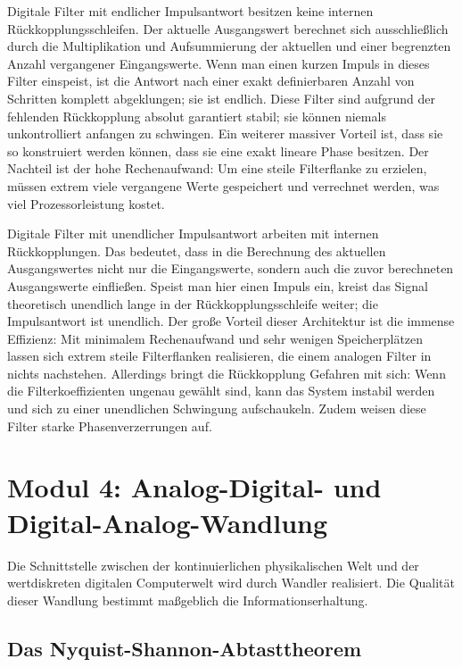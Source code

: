 \documentclass[11pt,a4paper]{article}
\begin{document}
Digitale Filter mit endlicher Impulsantwort besitzen keine internen Rückkopplungsschleifen. Der aktuelle Ausgangswert berechnet sich ausschließlich durch die Multiplikation und Aufsummierung der aktuellen und einer begrenzten Anzahl vergangener Eingangswerte. Wenn man einen kurzen Impuls in dieses Filter einspeist, ist die Antwort nach einer exakt definierbaren Anzahl von Schritten komplett abgeklungen; sie ist endlich. Diese Filter sind aufgrund der fehlenden Rückkopplung absolut garantiert stabil; sie können niemals unkontrolliert anfangen zu schwingen. Ein weiterer massiver Vorteil ist, dass sie so konstruiert werden können, dass sie eine exakt lineare Phase besitzen. Der Nachteil ist der hohe Rechenaufwand: Um eine steile Filterflanke zu erzielen, müssen extrem viele vergangene Werte gespeichert und verrechnet werden, was viel Prozessorleistung kostet.

Digitale Filter mit unendlicher Impulsantwort arbeiten mit internen Rückkopplungen. Das bedeutet, dass in die Berechnung des aktuellen Ausgangswertes nicht nur die Eingangswerte, sondern auch die zuvor berechneten Ausgangswerte einfließen. Speist man hier einen Impuls ein, kreist das Signal theoretisch unendlich lange in der Rückkopplungsschleife weiter; die Impulsantwort ist unendlich. Der große Vorteil dieser Architektur ist die immense Effizienz: Mit minimalem Rechenaufwand und sehr wenigen Speicherplätzen lassen sich extrem steile Filterflanken realisieren, die einem analogen Filter in nichts nachstehen. Allerdings bringt die Rückkopplung Gefahren mit sich: Wenn die Filterkoeffizienten ungenau gewählt sind, kann das System instabil werden und sich zu einer unendlichen Schwingung aufschaukeln. Zudem weisen diese Filter starke Phasenverzerrungen auf.

\newpage

\section{Modul 4: Analog-Digital- und Digital-Analog-Wandlung}

Die Schnittstelle zwischen der kontinuierlichen physikalischen Welt und der wertdiskreten digitalen Computerwelt wird durch Wandler realisiert. Die Qualität dieser Wandlung bestimmt maßgeblich die Informationserhaltung.

\subsection{Das Nyquist-Shannon-Abtasttheorem}
\end{document}
